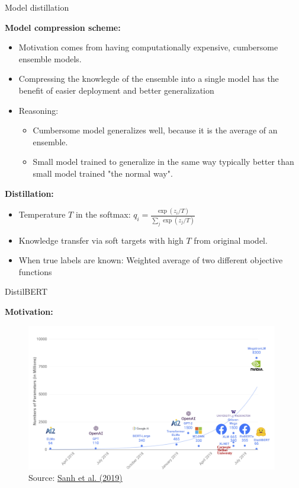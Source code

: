 \documentclass[]{beamer}
\begin{document}
\begin{frame}{Model distillation \href{https://arxiv.org/pdf/1503.02531.pdf}{}}

\textbf{Model compression scheme:}

\begin{itemize}
	\item Motivation comes from having computationally expensive, cumbersome ensemble models. \href{http://www.niculescu-mizil.org/papers/rtpp364-bucila.rev2.pdf}{}
	\item Compressing the knowlegde of the ensemble into a single model has the benefit of easier deployment and better generalization
	\item Reasoning:
		\begin{itemize}
			\item Cumbersome model generalizes well, because it is the average of an ensemble.
			\item Small model trained to generalize in the same way typically better than small model trained "the normal way".
		\end{itemize}
\end{itemize}

\textbf{Distillation:}

\begin{itemize}
	\item Temperature $T$ in the softmax: $q_i = \frac{\exp(z_i/T)}{\sum_j \exp(z_j/T)}$
	\item Knowledge transfer via soft targets with high $T$ from original model.
	\item When true labels are known: Weighted average of two different objective functions
\end{itemize}

	
\end{frame}



\begin{frame}{DistilBERT \href{https://arxiv.org/pdf/1910.01108.pdf}{}}

\textbf{Motivation:}
	\begin{figure}
		\centering
		\includegraphics[width = 11cm]{figure/distilbert-motivation}\\ 
		{\footnotesize Source: \href{https://arxiv.org/pdf/1910.01108.pdf}{Sanh et al. (2019)}}
	\end{figure}
	
\end{frame}
\end{document}
